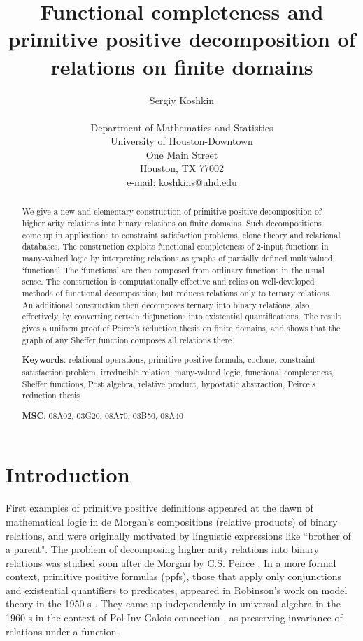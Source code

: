 \documentclass[11pt]{article}
\title{Functional completeness and primitive positive decomposition of relations on finite domains}
\author{Sergiy Koshkin\\
\\
Department of Mathematics and Statistics\\
University of Houston-Downtown\\
One Main Street\\
Houston, TX 77002\\
e-mail: koshkins@uhd.edu}
\date{}
\theoremstyle{plain}
\theoremstyle{definition}
\begin{document}
\maketitle
\begin{abstract} 

We give a new and elementary construction of primitive positive decomposition of higher arity relations into binary relations on finite domains. Such decompositions come up in applications to constraint satisfaction problems, clone theory and relational databases. The construction exploits functional completeness of 2-input functions in many-valued logic by interpreting relations as graphs of partially defined multivalued `functions'. The `functions' are then composed from ordinary functions in the usual sense. The construction is computationally effective and relies on well-developed methods of functional decomposition, but reduces relations only to ternary relations. An additional construction then decomposes ternary into binary relations, also effectively, by converting certain disjunctions into existential quantifications. The result gives a uniform proof of Peirce's reduction thesis on finite domains, and shows that the graph of any Sheffer function composes all relations there. 
 
\bigskip

\textbf{Keywords}: relational operations, primitive positive formula, coclone, constraint satisfaction problem, irreducible relation, many-valued logic, functional completeness, Sheffer functions, Post algebra, relative product, hypostatic abstraction, Peirce's reduction thesis
\medskip

\textbf{MSC}: 08A02, 03G20, 08A70, 03B50, 08A40
\end{abstract}


\section*{Introduction}


First examples of primitive positive definitions appeared at the dawn of mathematical logic in de Morgan's compositions (relative products) of binary relations, and were originally motivated by linguistic expressions like ``brother of a parent". The problem of decomposing higher arity relations into binary relations was studied soon after de Morgan by C.S. Peirce \cite{Brun91}. In a more formal context, primitive positive formulas (ppfs), those that apply only conjunctions and existential quantifiers to predicates, appeared in Robinson's work on model theory in the 1950-s \cite{Rob62}. They came up independently in universal algebra in the 1960-s in the context of Pol-Inv Galois connection \cite{Born08,Lau}, as preserving invariance of relations under a function. 
\end{document}
